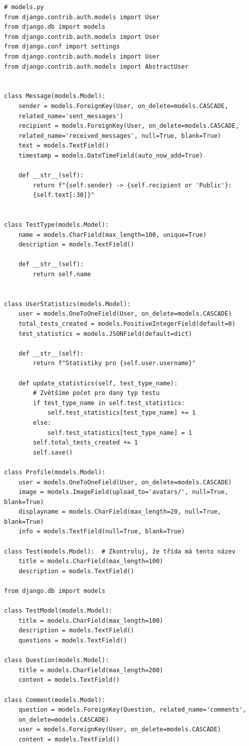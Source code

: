\documentclass[12pt, a4paper, twoside, openright]{report}
\begin{document}
	\begin{lstlisting}[style=Python, caption=Definice datových modelů]
# models.py
from django.contrib.auth.models import User
from django.db import models
from django.contrib.auth.models import User
from django.conf import settings
from django.contrib.auth.models import User
from django.contrib.auth.models import AbstractUser


class Message(models.Model):
    sender = models.ForeignKey(User, on_delete=models.CASCADE, 
    related_name='sent_messages')
    recipient = models.ForeignKey(User, on_delete=models.CASCADE, 
    related_name='received_messages', null=True, blank=True)
    text = models.TextField()
    timestamp = models.DateTimeField(auto_now_add=True)

    def __str__(self):
        return f"{self.sender} -> {self.recipient or 'Public'}: 
        {self.text[:30]}"


class TestType(models.Model):
    name = models.CharField(max_length=100, unique=True)
    description = models.TextField()

    def __str__(self):
        return self.name


class UserStatistics(models.Model):
    user = models.OneToOneField(User, on_delete=models.CASCADE)
    total_tests_created = models.PositiveIntegerField(default=0)
    test_statistics = models.JSONField(default=dict)

    def __str__(self):
        return f"Statistiky pro {self.user.username}"

    def update_statistics(self, test_type_name):
        # Zvětšíme počet pro daný typ testu
        if test_type_name in self.test_statistics:
            self.test_statistics[test_type_name] += 1
        else:
            self.test_statistics[test_type_name] = 1
        self.total_tests_created += 1
        self.save()

class Profile(models.Model):
    user = models.OneToOneField(User, on_delete=models.CASCADE)
    image = models.ImageField(upload_to='avatars/', null=True, blank=True)
    displayname = models.CharField(max_length=20, null=True, blank=True)
    info = models.TextField(null=True, blank=True)

class Test(models.Model):  # Zkontroluj, že třída má tento název
    title = models.CharField(max_length=100)
    description = models.TextField()

from django.db import models

class TestModel(models.Model):
    title = models.CharField(max_length=100)
    description = models.TextField()
    questions = models.TextField() 

class Question(models.Model):
    title = models.CharField(max_length=200)
    content = models.TextField()

class Comment(models.Model):
    question = models.ForeignKey(Question, related_name='comments', 
    on_delete=models.CASCADE)
    user = models.ForeignKey(User, on_delete=models.CASCADE)
    content = models.TextField()


	\end{lstlisting}
\end{document}

